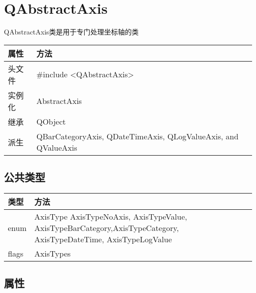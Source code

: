 \chapter{QAbstractAxis}

QAbstractAxis类是用于专门处理坐标轴的类

\begin{longtable}{|l|l|}
\hline
属性 & 方法 \\
\hline
头文件 & \#include <QAbstractAxis>\\      
\hline
实例化 & AbstractAxis\\      
\hline
继承&QObject \\
\hline
派生 & QBarCategoryAxis, QDateTimeAxis, QLogValueAxis, and QValueAxis \\
\hline
\end{longtable}

\splitLine

\section{公共类型}

\begin{longtable}{|l|l|}
\hline
类型 & 方法 \\
\hline
enum &	AxisType { AxisTypeNoAxis, AxisTypeValue, AxisTypeBarCategory,AxisTypeCategory, AxisTypeDateTime, AxisTypeLogValue }\\
\hline
flags &	AxisTypes\\
\hline
\end{longtable}

\section{属性}

